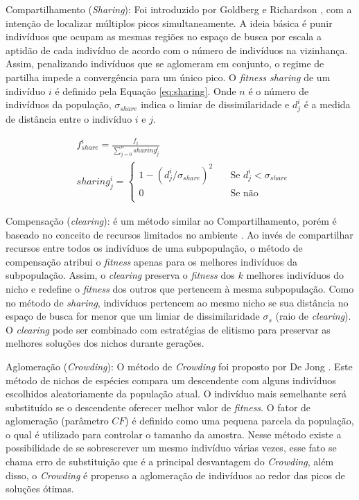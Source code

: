 Compartilhamento (\textit{Sharing}): Foi introduzido por Goldberg e Richardson \cite{sharing}, com a intenção de localizar múltiplos picos simultaneamente. A ideia básica é punir indivíduos que ocupam as mesmas regiões no espaço de busca por escala a aptidão de cada indivíduo de acordo com o número de indivíduos na vizinhança. Assim, penalizando indivíduos que se aglomeram em conjunto, o regime de partilha impede a convergência para um único pico. O \textit{fitness sharing} de um indivíduo $i$ é definido pela Equação \ref{eq:sharing}. Onde $n$ é o número de indivíduos da população, $\sigma_{share}$ indica o limiar de dissimilaridade e $d_j^i$ é a medida de distância entre o indivíduo $i$ e $j$.

\begin{equation}
\label{eq:sharing}
\begin{split}
& f_{share}^i = \frac{f_i}{\sum_{j=0}^{n} sharing_j^i} \\
& sharing_j^i =
	\begin{cases}
	1 - (d_j^i/\sigma_{share})^2 	& \quad \text{Se } d_j^i < \sigma_{share}\\
	0 							& \quad \text{Se não}\\
	\end{cases} 
\end{split}
\end{equation}

Compensação (\textit{clearing}): é um método similar ao Compartilhamento, porém é baseado no conceito de recursos limitados no ambiente \cite{clearing}. Ao invés de compartilhar recursos entre todos os indivíduos de uma subpopulação, o método de compensação atribui o \textit{fitness} apenas para os melhores indivíduos da subpopulação. Assim, o \textit{clearing} preserva o \textit{fitness} dos $k$ melhores indivíduos do nicho e redefine o \textit{fitness} dos outros que pertencem à mesma subpopulação. Como no método de \textit{sharing}, indivíduos pertencem ao mesmo nicho se sua distância no espaço de busca for menor que um limiar de dissimilaridade $\sigma_s$ (raio de \textit{clearing}). O \textit{clearing} pode ser combinado com estratégias de elitismo para preservar as melhores soluções dos nichos durante gerações.

Aglomeração (\textit{Crowding}): O método de \textit{Crowding} foi proposto por De Jong \cite{crowding}. Este método de nichos de espécies compara um descendente com alguns indivíduos escolhidos aleatoriamente da população atual. O indivíduo mais semelhante será substituído se o descendente oferecer melhor valor de \textit{fitness}. O fator de aglomeração (parâmetro $CF$) é definido como uma pequena parcela da população, o qual é utilizado para controlar o tamanho da amostra. Nesse método existe a possibilidade de se sobrescrever um mesmo indivíduo várias vezes, esse fato se chama erro de substituição que é a principal desvantagem do \textit{Crowding}, além disso, o \textit{Crowding} é propenso a aglomeração de indivíduos ao redor das picos de soluções ótimas.

